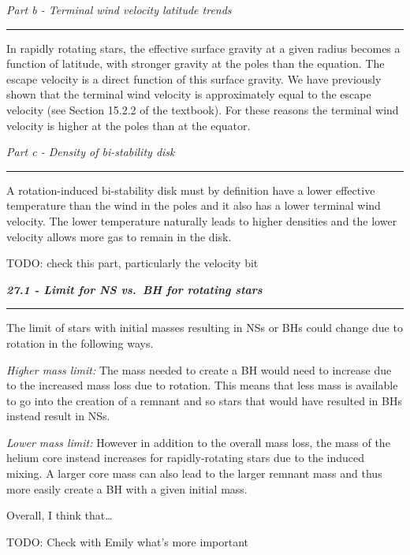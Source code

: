 \documentclass[12pt, letterpaper, twoside]{article}
\newcommand{\question}[1]{{\noindent \it #1}}
\newcommand{\answer}[1]{
    \par\noindent\rule{\textwidth}{0.4pt}#1\vspace{0.5cm}
}
\newcommand{\todo}[1]{{\color{red}\begin{center}TODO: #1\end{center}}}
\begin{document}
\question{Part b - Terminal wind velocity latitude trends}
\answer{
    In rapidly rotating stars, the effective surface gravity at a given radius becomes a function of latitude, with stronger gravity at the poles than the equation. The escape velocity is a direct function of this surface gravity. We have previously shown that the terminal wind velocity is approximately equal to the escape velocity (see Section 15.2.2 of the textbook). For these reasons the terminal wind velocity is higher at the poles than at the equator.
}

\question{Part c - Density of bi-stability disk}
\answer{
    A rotation-induced bi-stability disk must by definition have a lower effective temperature than the wind in the poles and it also has a lower terminal wind velocity. The lower temperature naturally leads to higher densities and the lower velocity allows more gas to remain in the disk.
    \todo{check this part, particularly the velocity bit}
}

\question{\textbf{27.1 - Limit for NS vs.\ BH for rotating stars}}
\answer{
    The limit of stars with initial masses resulting in NSs or BHs could change due to rotation in the following ways.

    \textit{Higher mass limit:} The mass needed to create a BH would need to increase due to the increased mass loss due to rotation. This means that less mass is available to go into the creation of a remnant and so stars that would have resulted in BHs instead result in NSs.

    \textit{Lower mass limit:} However in addition to the overall mass loss, the mass of the helium core instead increases for rapidly-rotating stars due to the induced mixing. A larger core mass can also lead to the larger remnant mass and thus more easily create a BH with a given initial mass.

    Overall, I think that\dots
    \todo{Check with Emily what's more important}
}
\end{document}

